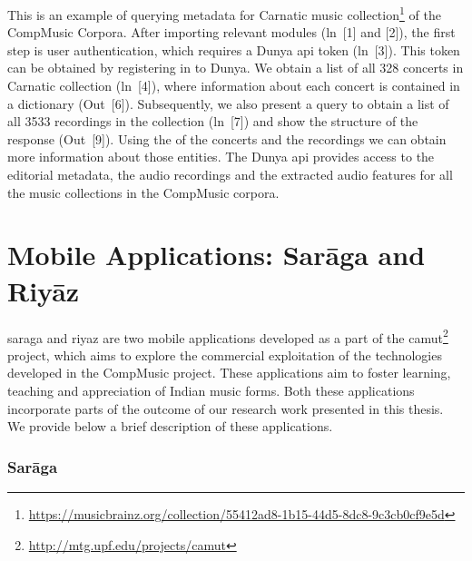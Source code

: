 This is an example of querying metadata for Carnatic music collection\footnote{\url{https://musicbrainz.org/collection/55412ad8-1b15-44d5-8dc8-9c3cb0cf9e5d}} of the CompMusic Corpora. After importing relevant modules (ln~[1] and [2]), the first step is user authentication, which requires a Dunya \gls{api} token (ln~[3]). This token can be obtained by registering in to Dunya. We obtain a list of all 328 concerts in Carnatic collection (ln~[4]), where information about each concert is contained in a dictionary (Out~[6]). Subsequently, we also present a query to obtain a list of all 3533 recordings in the collection (ln~[7]) and show the structure of the response (Out~[9]). Using the  of the concerts and the recordings we can obtain more information about those entities. The Dunya \gls{api} provides access to the editorial metadata, the audio recordings and the extracted audio features for all the music collections in the CompMusic corpora.

\section{Mobile Applications: Sar\={a}ga and Riy\={a}z}
\label{sec:mobile_apps_camut}

\gls{saraga} and \gls{riyaz} are two mobile applications developed as a part of the \gls{camut}\footnote{\url{http://mtg.upf.edu/projects/camut}} project, which aims to explore the commercial exploitation of the technologies developed in the CompMusic project. These applications aim to foster learning, teaching and appreciation of Indian music forms. Both these applications incorporate parts of the outcome of our research work presented in this thesis. We provide below a brief description of these applications. 

\subsubsection{Sar\={a}ga}
\label{sec:saraga}

